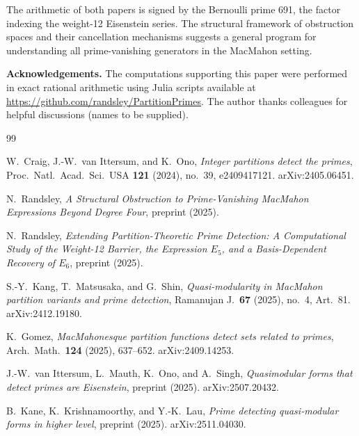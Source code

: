 \documentclass[11pt]{article}
\begin{document}
The arithmetic of both papers is signed by the Bernoulli prime 691, the factor indexing
the weight-12 Eisenstein series.
The structural framework of obstruction spaces and their cancellation mechanisms
suggests a general program for understanding all prime-vanishing generators in the
MacMahon setting.

\medskip
\noindent\textbf{Acknowledgements.}
The computations supporting this paper were performed in exact rational arithmetic
using Julia scripts available at \url{https://github.com/randsley/PartitionPrimes}.
The author thanks colleagues for helpful discussions (names to be supplied).

\begin{thebibliography}{99}

W.~Craig, J.-W.~van Ittersum, and K.~Ono,
\emph{Integer partitions detect the primes},
Proc.\ Natl.\ Acad.\ Sci.\ USA \textbf{121} (2024), no.~39, e2409417121.
\newblock arXiv:2405.06451.

N.~Randsley,
\emph{A Structural Obstruction to Prime-Vanishing MacMahon Expressions Beyond Degree Four},
preprint (2025).

N.~Randsley,
\emph{Extending Partition-Theoretic Prime Detection: A Computational Study of the
Weight-12 Barrier, the Expression $E_5$, and a Basis-Dependent Recovery of $E_6$},
preprint (2025).

S.-Y.~Kang, T.~Matsusaka, and G.~Shin,
\emph{Quasi-modularity in MacMahon partition variants and prime detection},
Ramanujan J.\ \textbf{67} (2025), no.~4, Art.~81.
\newblock arXiv:2412.19180.

K.~Gomez,
\emph{MacMahonesque partition functions detect sets related to primes},
Arch.\ Math.\ \textbf{124} (2025), 637--652.
\newblock arXiv:2409.14253.

J.-W.~van Ittersum, L.~Mauth, K.~Ono, and A.~Singh,
\emph{Quasimodular forms that detect primes are Eisenstein},
preprint (2025).
\newblock arXiv:2507.20432.

B.~Kane, K.~Krishnamoorthy, and Y.-K.~Lau,
\emph{Prime detecting quasi-modular forms in higher level},
preprint (2025).
\newblock arXiv:2511.04030.


\end{thebibliography}
\end{document}
